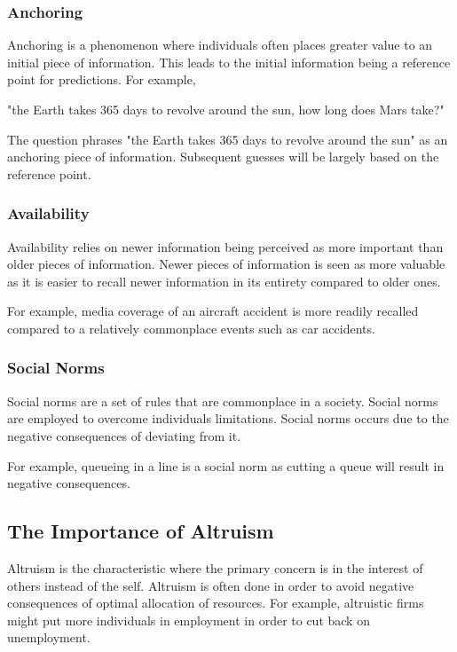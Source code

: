 \documentclass[a4paper,10pt]{article}
\begin{document}
\begin{multicols*}{2}
	\subsubsection{Anchoring}
	Anchoring is a phenomenon where individuals often places greater value to an initial piece of information. This leads to the initial information being a reference point for predictions. For example,
	\begin{center}
		\begin{minipage}{0.75\linewidth}
			"the Earth takes 365 days to revolve around the sun, how long does Mars take?"
		\end{minipage}
	\end{center}
	The question phrases "the Earth takes 365 days to revolve around the sun" as an anchoring piece of information. Subsequent guesses will be largely based on the reference point.

	\subsubsection{Availability}
	Availability relies on newer information being perceived as more important than older pieces of information. Newer pieces of information is seen as more valuable as it is easier to recall newer information in its entirety compared to older ones.
	\medskip

	For example, media coverage of an aircraft accident is more readily recalled compared to a relatively commonplace events such as car accidents.

	\subsubsection{Social Norms}
	Social norms are a set of rules that are commonplace in a society. Social norms are employed to overcome individuals limitations. Social norms occurs due to the negative consequences of deviating from it.
	\medskip

	For example, queueing in a line is a social norm as cutting a queue will result in negative consequences.

	\subsection{The Importance of Altruism}
	Altruism is the characteristic where the primary concern is in the interest of others instead of the self. Altruism is often done in order to avoid negative consequences of optimal allocation of resources. For example, altruistic firms might put more individuals in employment in order to cut back on unemployment.


\end{multicols*}
\end{document}
